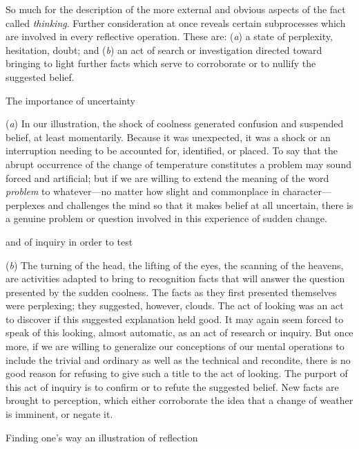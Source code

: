 \documentclass[letterpaper]{book}
\begin{document}
So much for the description of the more external and obvious aspects of
the fact called \emph{thinking}. Further consideration at once reveals
certain subprocesses which are involved in every reflective operation.
These are: (\emph{a}) a state of perplexity, hesitation, doubt; and
(\emph{b}) an act of search or investigation directed toward bringing to
light further facts which serve to corroborate or to nullify the
suggested belief.

The importance of uncertainty

(\emph{a}) In our illustration, the shock of coolness generated
confusion and suspended belief, at least momentarily. Because it was
unexpected, it was a shock or an interruption needing to be accounted
for, identified, or placed. To say that the abrupt occurrence of the
change of temperature constitutes a problem may sound forced and
artificial; but if we are willing to extend the meaning of the word
\emph{problem} to whatever---no matter how slight and commonplace in
character---perplexes and challenges the mind so that it makes belief at
all uncertain, there is a genuine problem or question involved in this
experience of sudden change.

and of inquiry in order to test

(\emph{b}) The turning of the head, the lifting of the eyes, the
scanning of the heavens, are activities adapted to bring to recognition
facts that will answer the question presented by the sudden coolness.
The facts as
they
first presented themselves were perplexing; they suggested, however,
clouds. The act of looking was an act to discover if this suggested
explanation held good. It may again seem forced to speak of this
looking, almost automatic, as an act of research or inquiry. But once
more, if we are willing to generalize our conceptions of our mental
operations to include the trivial and ordinary as well as the technical
and recondite, there is no good reason for refusing to give such a title
to the act of looking. The purport of this act of inquiry is to confirm
or to refute the suggested belief. New facts are brought to perception,
which either corroborate the idea that a change of weather is imminent,
or negate it.

Finding one's way an illustration of reflection
\end{document}
